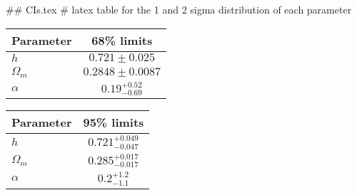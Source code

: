 ## CIs.tex
# latex table for the 1 and 2 sigma distribution of each parameter

\begin{tabular} { l  c}
 Parameter &  68\% limits\\
\hline
{\boldmath$h              $} & $0.721\pm 0.025            $\\
{\boldmath$\Omega_m       $} & $0.2848\pm 0.0087          $\\
{\boldmath$\alpha         $} & $0.19^{+0.52}_{-0.69}      $\\
\hline
\end{tabular}

\begin{tabular} { l  c}
 Parameter &  95\% limits\\
\hline
{\boldmath$h              $} & $0.721^{+0.049}_{-0.047}   $\\
{\boldmath$\Omega_m       $} & $0.285^{+0.017}_{-0.017}   $\\
{\boldmath$\alpha         $} & $0.2^{+1.2}_{-1.1}         $\\
\hline
\end{tabular}
